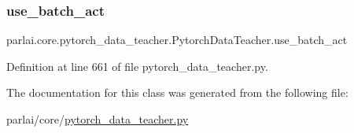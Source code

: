 \subsubsection{\texorpdfstring{use\+\_\+batch\+\_\+act}{use\_batch\_act}}
{\footnotesize\ttfamily parlai.\+core.\+pytorch\+\_\+data\+\_\+teacher.\+Pytorch\+Data\+Teacher.\+use\+\_\+batch\+\_\+act}



Definition at line 661 of file pytorch\+\_\+data\+\_\+teacher.\+py.



The documentation for this class was generated from the following file\+:\begin{DoxyCompactItemize}
\item 
parlai/core/\hyperlink{pytorch__data__teacher_8py}{pytorch\+\_\+data\+\_\+teacher.\+py}\end{DoxyCompactItemize}
